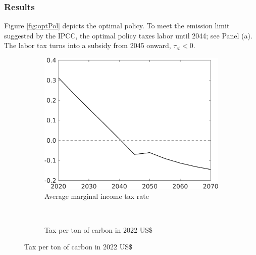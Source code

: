 \subsubsection{Results}\label{sec:optres}
Figure \ref{fig:optPol} depicts the optimal policy.
To meet the emission limit suggested by the IPCC, the optimal policy taxes labor until 2044; see Panel (a). The labor tax  turns into a subsidy from 2045 onward, $\tau_{\iota t}<0$. 
\vspace{3mm}
\begin{figure}[h!!]
	\centering
	\caption{Optimal policy }\label{fig:optPol}
	\begin{subfigure}{0.4\textwidth}
		\caption{Average marginal income tax rate }
		\includegraphics[width=1\textwidth]{../../codding_model/own_basedOnFried/optimalPol_010922_revision/figures/all_13Sept22_Tplus30/dTaulAv_OPT_T_NoTaus_COMPtaul_regime4_spillover0_knspil0_noskill0_sep0_xgrowth0_PV1_etaa0.79_lgd0.png}
	\end{subfigure}
\begin{minipage}[]{0.1\textwidth}
	\
\end{minipage}
	\begin{subfigure}{0.4\textwidth}
		\caption{Tax per ton of carbon in 2022 US\$ }

\end{subfigure}
\end{figure}
